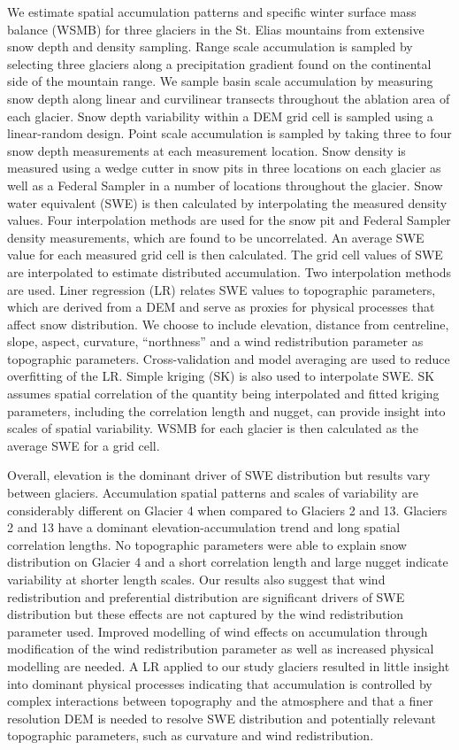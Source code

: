 \documentclass[review,oneside, letterpaper]{igs}
\begin{document}
We estimate spatial accumulation patterns and specific winter surface mass balance (WSMB) for three glaciers in the St. Elias mountains from extensive snow depth and density sampling. Range scale accumulation is sampled by selecting three glaciers along a precipitation gradient found on the continental side of the mountain range. We sample basin scale accumulation by measuring snow depth along linear and curvilinear transects throughout the ablation area of each glacier. Snow depth variability within a DEM grid cell is sampled using a linear-random design. Point scale accumulation is sampled by taking three to four snow depth measurements at each measurement location. Snow density is measured using a wedge cutter in snow pits in three locations on each glacier as well as a Federal Sampler in a number of locations throughout the glacier. Snow water equivalent (SWE) is then calculated by interpolating the measured density values. Four interpolation methods are used for the snow pit and Federal Sampler density measurements, which are found to be uncorrelated. An average SWE value for each measured grid cell is then calculated. The grid cell values of SWE are interpolated to estimate distributed accumulation. Two interpolation methods are used. Liner regression (LR) relates SWE values to topographic parameters, which are derived from a DEM and serve as proxies for physical processes that affect snow distribution. We choose to include elevation, distance from centreline, slope, aspect, curvature, ``northness'' and a wind redistribution parameter as topographic parameters. Cross-validation and model averaging are used to reduce overfitting of the LR. Simple kriging (SK) is also used to interpolate SWE. SK assumes spatial correlation of the quantity being interpolated and fitted kriging parameters, including the correlation length and nugget, can provide insight into scales of spatial variability. WSMB for each glacier is then calculated as the average SWE for a grid cell.

Overall, elevation is the dominant driver of SWE distribution but results vary between glaciers. Accumulation spatial patterns and scales of variability are considerably different on Glacier 4 when compared to Glaciers 2 and 13. Glaciers 2 and 13 have a dominant elevation-accumulation trend and long spatial correlation lengths. No topographic parameters were able to explain snow distribution on Glacier 4 and a short correlation length and large nugget indicate variability at shorter length scales. Our results also suggest that wind redistribution and preferential distribution are significant drivers of SWE distribution but these effects are not captured by the wind redistribution parameter used. Improved modelling of wind effects on accumulation through modification of the wind redistribution parameter as well as increased physical modelling are needed. A LR applied to our study glaciers resulted in little insight into dominant physical processes indicating that accumulation is controlled by complex interactions between topography and the atmosphere and that a finer resolution DEM is needed to resolve SWE distribution and potentially relevant topographic parameters, such as curvature and wind redistribution.
\end{document}
